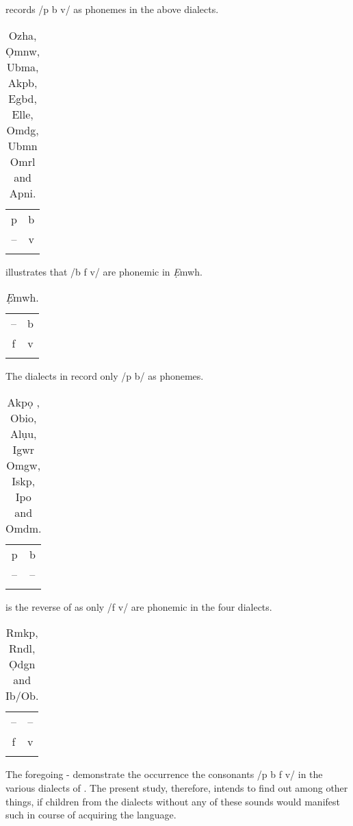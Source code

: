 \documentclass[output=paper,
modfonts
]{langscibook}
\begin{document}
 records /p b v/ as phonemes in the above dialects.

\begin{table}
\begin{tabular}{cc}
\lsptoprule
 p& b\\
 -- & v\\
\lspbottomrule
\end{tabular}
\caption{Ozha, Ọmnw, Ubma, Akpb, Egbd, Elle, Omdg, Ubmn Omrl and Apni.}
\label{tab:alerechi:4}
\end{table}

 illustrates that /b f v/ are phonemic in \emph{\textup{Ẹ}}mwh.

\begin{table}
\begin{tabular}{cc}
\lsptoprule
 -- & b\\
 f& v\\
\lspbottomrule
\end{tabular}
\caption{\emph{Ẹ}mwh.}
\label{tab:alerechi:5}
\end{table}

The dialects in  record only /p b/ as phonemes.

\begin{table}
\begin{tabular}{cc}
\lsptoprule
 p& b\\
 -- & -- \\
\lspbottomrule
\end{tabular}
\caption{Akpọ , Obio, Alụu, Igwr Omgw, Iskp, Ipo and Omdm.}
\label{tab:alerechi:6}
\end{table}
 
 is the reverse of  as only /f v/ are phonemic in the four dialects.

\begin{table}[h!]
\begin{tabular}{cc}
\lsptoprule
 -- & -- \\
 f& v\\
\lspbottomrule
\end{tabular}
\caption{Rmkp, Rndl, Ọdgn and Ib/Ob.}
\label{tab:alerechi:7} 
\end{table}

\clearpage 
The foregoing  -  demonstrate the occurrence the consonants /p b f v/ in the various dialects of . The present study, therefore, intends to find out among other things, if children from the dialects without any of these sounds would manifest such in course of acquiring the language.
\end{document}
